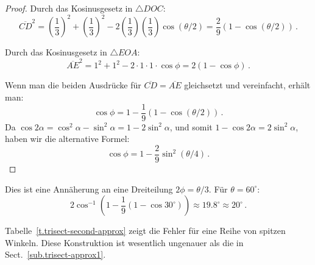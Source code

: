\begin{proof} Durch das Kosinusgesetz in $\triangle DOC$:
\[
\overline{CD}^2= \left(\frac{1}{3}\right)^2+\left(\frac{1}{3}\right)^2-2\left(\frac{1}{3}\right)\left(\frac{1}{3}\right)\cos (\theta/2)=\frac{2}{9}(1-\cos(\theta/2))\,.
\]

Durch das Kosinusgesetz in $\triangle EOA$:
\[
\overline{AE}^2 = 1^2+1^2-2\cdot 1\cdot 1\cdot \cos \phi=2(1-\cos \phi)\,.
\]

Wenn man die beiden Ausdrücke für $\overline{CD}=\overline{AE}$ gleichsetzt und vereinfacht, erhält man:
\[
\cos \phi = 1 - \frac{1}{9}(1-\cos(\theta/2))\,.
\]
Da $\cos 2\alpha= \cos^2 \alpha-\sin^2\alpha=1-2\sin^2\alpha$, und somit $1-\cos 2\alpha=2\sin^2\alpha$, haben wir die alternative Formel:
\[
\cos \phi = 1 - \frac{2}{9}\sin^2(\theta/4)\,.
\]
\end{proof}

Dies ist eine Annäherung an eine Dreiteilung $2\phi=\theta/3$. Für $\theta=60^\circ$:
\[
2\cos^{-1}\left(1 - \frac{1}{9}(1-\cos 30^\circ)\right)\approx 19.8^\circ\approx 20^\circ\,.
\]

Tabelle~\ref{t.trisect-second-approx} zeigt die Fehler für eine Reihe von spitzen Winkeln. Diese Konstruktion ist wesentlich ungenauer als die in Sect.~\ref{sub.trisect-approx1}.

